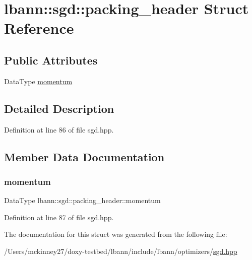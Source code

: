 \hypertarget{structlbann_1_1sgd_1_1packing__header}{}\section{lbann\+:\+:sgd\+:\+:packing\+\_\+header Struct Reference}
\label{structlbann_1_1sgd_1_1packing__header}
\subsection*{Public Attributes}
\begin{DoxyCompactItemize}
\item 
Data\+Type \hyperlink{structlbann_1_1sgd_1_1packing__header_a76cff0164cd32346eac4036a8a643776}{momentum}
\end{DoxyCompactItemize}


\subsection{Detailed Description}


Definition at line 86 of file sgd.\+hpp.



\subsection{Member Data Documentation}
\mbox{\label{structlbann_1_1sgd_1_1packing__header_a76cff0164cd32346eac4036a8a643776}} 
\subsubsection{\texorpdfstring{momentum}{momentum}}
{\footnotesize\ttfamily Data\+Type lbann\+::sgd\+::packing\+\_\+header\+::momentum}



Definition at line 87 of file sgd.\+hpp.



The documentation for this struct was generated from the following file\+:\begin{DoxyCompactItemize}
\item 
/\+Users/mckinney27/doxy-\/testbed/lbann/include/lbann/optimizers/\hyperlink{sgd_8hpp}{sgd.\+hpp}\end{DoxyCompactItemize}
